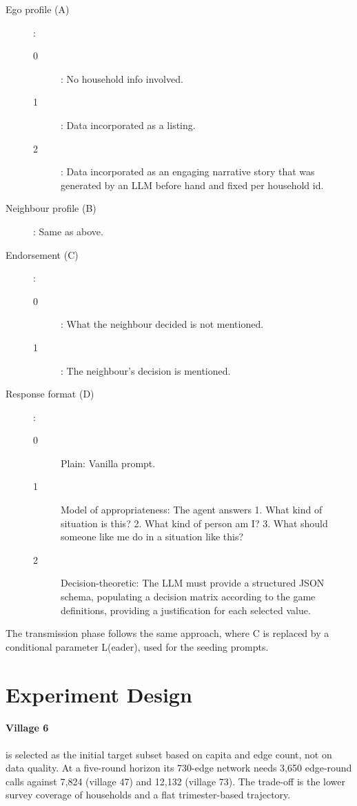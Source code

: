 \documentclass[11pt]{article}
\begin{document}
\begin{description}
    \item[Ego profile (A)]: 
    \begin{description}
        \item[0]: No household info involved.
        \item[1]: Data incorporated as a listing.
        \item[2]: Data incorporated as an engaging narrative story that was generated by an LLM before hand and fixed per household id.   
    \end{description}
    \item[Neighbour profile (B)]: Same as above.
    \item[Endorsement (C)]:
    \begin{description}
        \item[0]: What the neighbour decided is not mentioned.
        \item[1]: The neighbour's decision is mentioned.  
    \end{description}
    \item[Response format (D)]:
    \begin{description}
        \item[0]Plain: Vanilla prompt.
        \item[1]Model of appropriateness: The agent answers 1. What kind of situation is this? 2. What kind of person am I? 3. What should someone like me do in a situation like this?
        \item[2]Decision-theoretic: The LLM must provide a structured JSON schema, populating a decision matrix according to the game definitions, providing a justification for each selected value.   
    \end{description}
\end{description}
The transmission phase follows the same approach, where C is replaced by a conditional parameter L(eader), used for the seeding prompts.

\section{Experiment Design}

\paragraph{Village 6} is selected as the initial target subset based on capita and edge count, not on data quality.
At a five-round horizon its 730-edge network needs 3{,}650 edge-round calls against 7{,}824 (village 47)
and 12{,}132 (village 73). The trade-off is the lower survey coverage of households and a flat trimester-based trajectory.
\end{document}
